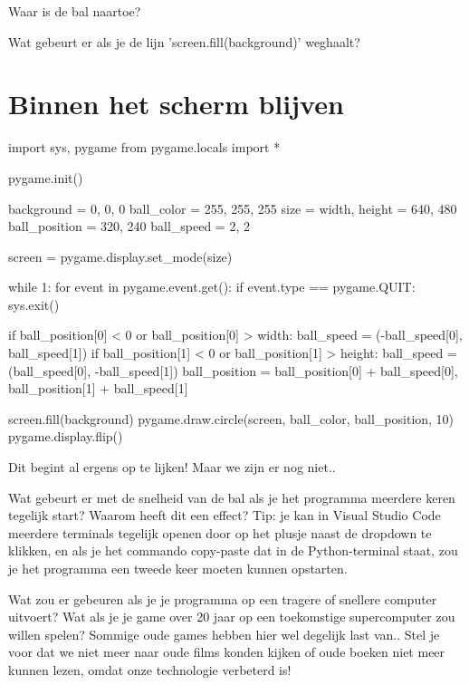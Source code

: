 \documentclass[10pt,a4paper]{article}
\newenvironment{task}{\smallpencil}{}
\begin{document}
\begin{task}
Waar is de bal naartoe?
\end{task}

\begin{task}
Wat gebeurt er als je de lijn 'screen.fill(background)' weghaalt?
\end{task}

\newpage
\section{Binnen het scherm blijven}

\begin{python}
import sys, pygame
from pygame.locals import *

pygame.init()

background = 0, 0, 0
ball_color = 255, 255, 255
size = width, height = 640, 480
ball_position = 320, 240
ball_speed = 2, 2

screen = pygame.display.set_mode(size)

while 1:
    for event in pygame.event.get():
        if event.type == pygame.QUIT: sys.exit()
    
    if ball_position[0] < 0 or ball_position[0] > width:
        ball_speed = (-ball_speed[0], ball_speed[1])
    if ball_position[1] < 0 or ball_position[1] > height:
        ball_speed = (ball_speed[0], -ball_speed[1])
    ball_position = ball_position[0] + ball_speed[0], ball_position[1] + ball_speed[1]

    screen.fill(background)
    pygame.draw.circle(screen, ball_color, ball_position, 10)
    pygame.display.flip()
\end{python}

Dit begint al ergens op te lijken! Maar we zijn er nog niet..

\begin{task}
Wat gebeurt er met de snelheid van de bal als je het programma meerdere keren tegelijk start? Waarom heeft dit een effect? Tip: je kan in Visual Studio Code meerdere terminals tegelijk openen door op het plusje naast de dropdown te klikken, en als je het commando copy-paste dat in de Python-terminal staat, zou je het programma een tweede keer moeten kunnen opstarten.
\end{task}

\begin{task}
Wat zou er gebeuren als je je programma op een tragere of snellere computer uitvoert? Wat als je je game over 20 jaar op een toekomstige supercomputer zou willen spelen? Sommige oude games hebben hier wel degelijk last van.. Stel je voor dat we niet meer naar oude films konden kijken of oude boeken niet meer kunnen lezen, omdat onze technologie verbeterd is!
\end{task}
\end{document}
